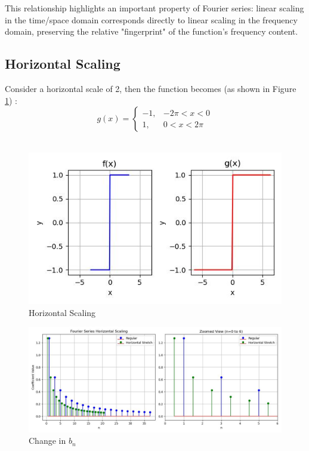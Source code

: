 \documentclass{article}
\begin{document}
This relationship highlights an important property of Fourier series: linear scaling in the time/space domain corresponds directly to linear scaling in the frequency domain, preserving the relative "fingerprint" of the function's frequency content.  

\subsection{Horizontal Scaling}
Consider a horizontal scale of 2, then the function becomes (as shown in Figure \ref{Horizontal_Scaling}) :
\begin{equation}
g(x) = 
\begin{cases} 
-1, & -2\pi < x < 0 \\
1, & 0 < x < 2\pi
\end{cases}
\end{equation}\\
\begin{figure}
    \centering
    \includegraphics[width=\textwidth]{horizontal_scaling.jpg}
    \caption{Horizontal Scaling}
    \label{Horizontal_Scaling}
\end{figure}
\begin{figure}
    \centering
    \includegraphics[width=\textwidth]{horizontal_stem_stretch.jpg}
    \caption{Change in $b_n$}
    \label{fig:horizontal_stem_stretch}
\end{figure}
\end{document}
